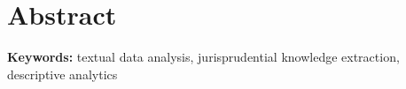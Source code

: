 \chapter*{Abstract}

\textbf{Keywords:} textual data analysis, jurisprudential knowledge extraction, descriptive analytics



